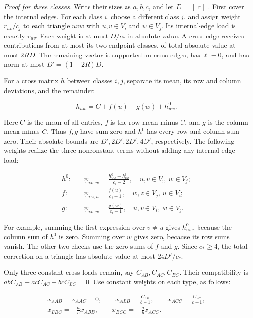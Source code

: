 \documentclass[english,11pt,a4paper]{article}
\begin{document}
\emph{Proof for three classes.} Write their sizes as \(a,b,c\), and let \(D=\|r\|\). First cover the internal edges. For each class \(i\), choose a different class \(j\), and assign weight \(r_{uv}/c_j\) to each triangle \(uvw\) with \(u,v\in V_i\) and \(w\in V_j\). Its internal-edge load is exactly \(r_{uv}\). Each weight is at most \(D/c_\ast\) in absolute value. A cross edge receives contributions from at most its two endpoint classes, of total absolute value at most \(2RD\). The remaining vector is supported on cross edges, has \(\ell=0\), and has norm at most \(D'=(1+2R)D\).

For a cross matrix \(h\) between classes \(i,j\), separate its mean, its row and column deviations, and the remainder:

\[h_{uw}=C+f(u)+g(w)+h^0_{uw}.\]

Here \(C\) is the mean of all entries, \(f\) is the row mean minus \(C\), and \(g\) is the column mean minus \(C\). Thus \(f,g\) have sum zero and \(h^0\) has every row and column sum zero. Their absolute bounds are \(D',2D',2D',4D'\), respectively. The following weights realize the three nonconstant terms without adding any internal-edge load:

\[\begin{aligned}
 h^0:&\quad \psi_{uv,w}=\frac{h^0_{uw}+h^0_{vw}}{c_i-2},\quad u,v\in V_i,\ w\in V_j;\\
 f:&\quad \psi_{wz,u}=\frac{f(u)}{c_j-1},\quad w,z\in V_j,\ u\in V_i;\\
 g:&\quad \psi_{uv,w}=\frac{g(w)}{c_i-1},\quad u,v\in V_i,\ w\in V_j.
\end{aligned}
\tag{B.1}\]

For example, summing the first expression over \(v\ne u\) gives \(h^0_{uw}\), because the column sum of \(h^0\) is zero. Summing over \(w\) gives zero, because its row sums vanish. The other two checks use the zero sums of \(f\) and \(g\). Since \(c_\ast\ge4\), the total correction on a triangle has absolute value at most \(24D'/c_\ast\).

Only three constant cross loads remain, say \(C_{AB},C_{AC},C_{BC}\). Their compatibility is \(abC_{AB}+acC_{AC}+bcC_{BC}=0\). Use constant weights on each type, as follows:

\[\begin{gathered}
x_{AAB}=x_{AAC}=0,\qquad
x_{ABB}=\frac{C_{AB}}{b-1},\qquad x_{ACC}=\frac{C_{AC}}{c-1},\\
x_{BBC}=-\frac{a}{c}x_{ABB},\qquad
x_{BCC}=-\frac{a}{b}x_{ACC}.
\end{gathered}
\tag{B.2}\]
\end{document}

